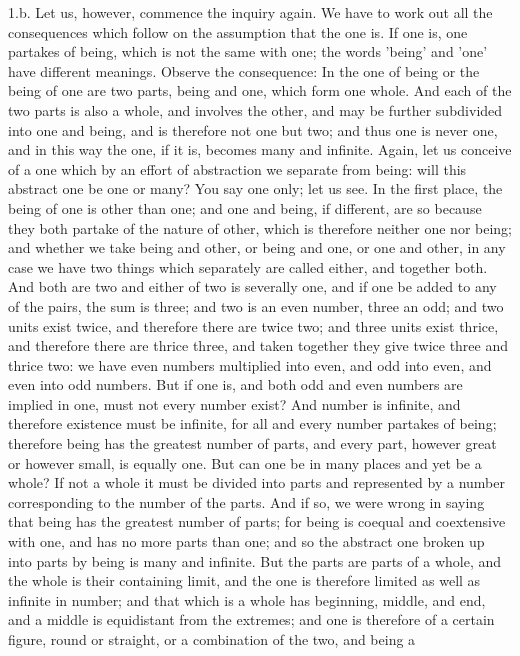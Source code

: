 1.b. Let us, however, commence the inquiry again. We have to work out
all the consequences which follow on the assumption that the one is. If
one is, one partakes of being, which is not the same with one; the words
'being' and 'one' have different meanings. Observe the consequence: In
the one of being or the being of one are two parts, being and one, which
form one whole. And each of the two parts is also a whole, and involves
the other, and may be further subdivided into one and being, and is
therefore not one but two; and thus one is never one, and in this way
the one, if it is, becomes many and infinite. Again, let us conceive
of a one which by an effort of abstraction we separate from being: will
this abstract one be one or many? You say one only; let us see. In the
first place, the being of one is other than one; and one and being,
if different, are so because they both partake of the nature of other,
which is therefore neither one nor being; and whether we take being
and other, or being and one, or one and other, in any case we have two
things which separately are called either, and together both. And both
are two and either of two is severally one, and if one be added to any
of the pairs, the sum is three; and two is an even number, three an odd;
and two units exist twice, and therefore there are twice two; and three
units exist thrice, and therefore there are thrice three, and taken
together they give twice three and thrice two: we have even numbers
multiplied into even, and odd into even, and even into odd numbers. But
if one is, and both odd and even numbers are implied in one, must not
every number exist? And number is infinite, and therefore existence must
be infinite, for all and every number partakes of being; therefore
being has the greatest number of parts, and every part, however great or
however small, is equally one. But can one be in many places and yet be
a whole? If not a whole it must be divided into parts and represented
by a number corresponding to the number of the parts. And if so, we were
wrong in saying that being has the greatest number of parts; for being
is coequal and coextensive with one, and has no more parts than one; and
so the abstract one broken up into parts by being is many and infinite.
But the parts are parts of a whole, and the whole is their containing
limit, and the one is therefore limited as well as infinite in number;
and that which is a whole has beginning, middle, and end, and a middle
is equidistant from the extremes; and one is therefore of a certain
figure, round or straight, or a combination of the two, and being a
